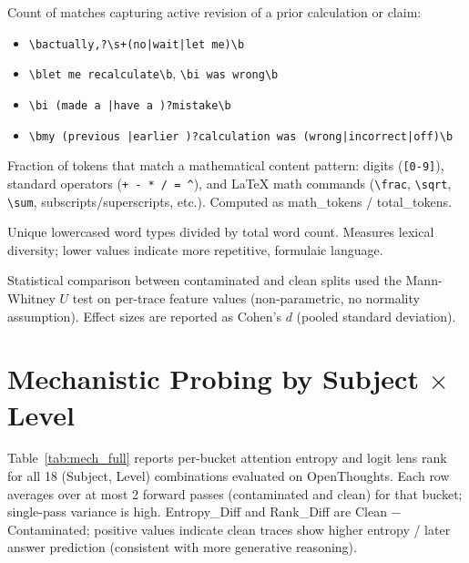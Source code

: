 \documentclass{article} %
\begin{document}
\begin{description}[leftmargin=1.5em, labelindent=0pt]
\item[\textbf{Self-correction.}] Count of matches capturing active revision of a prior calculation or claim:
\begin{itemize}[noitemsep]
  \item \texttt{\textbackslash bactually,?\textbackslash s+(no|wait|let me)\textbackslash b}
  \item \texttt{\textbackslash blet me recalculate\textbackslash b}, \quad \texttt{\textbackslash bi was wrong\textbackslash b}
  \item \texttt{\textbackslash bi (made a |have a )?mistake\textbackslash b}
  \item \texttt{\textbackslash bmy (previous |earlier )?calculation was (wrong|incorrect|off)\textbackslash b}
\end{itemize}

\item[\textbf{Math token density.}] Fraction of tokens that match a mathematical content pattern: digits (\texttt{[0-9]}), standard operators (\texttt{+~-~*~/~=~\^{}}), and \LaTeX{} math commands (\texttt{\textbackslash frac}, \texttt{\textbackslash sqrt}, \texttt{\textbackslash sum}, subscripts/superscripts, etc.). Computed as math\_tokens / total\_tokens.

\item[\textbf{Type-token ratio (TTR).}] Unique lowercased word types divided by total word count. Measures lexical diversity; lower values indicate more repetitive, formulaic language.

\end{description}

\noindent Statistical comparison between contaminated and clean splits used the Mann-Whitney $U$ test on per-trace feature values (non-parametric, no normality assumption). Effect sizes are reported as Cohen's $d$ (pooled standard deviation).

\section{Mechanistic Probing by Subject $\times$ Level}
\label{app:mech}

Table~\ref{tab:mech_full} reports per-bucket attention entropy and logit lens rank for all 18 (Subject, Level) combinations evaluated on OpenThoughts. Each row averages over at most 2 forward passes (contaminated and clean) for that bucket; single-pass variance is high. Entropy\_Diff and Rank\_Diff are Clean $-$ Contaminated; positive values indicate clean traces show higher entropy / later answer prediction (consistent with more generative reasoning).
\end{document}

